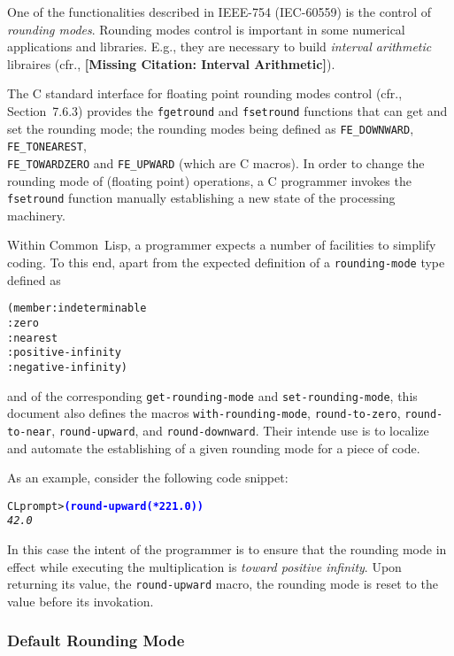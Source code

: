 \documentclass[10pt,fleqn]{article}
\newcommand{\CL}{\textsf{Common~Lisp}}
\newcommand{\CLang}{\textsf{C}}
\newcommand{\checkcite}[1]{{\textbf{[Missing Citation: #1]}}}
\newcommand{\code}[1]{\texttt{#1}}
\newcommand{\codeprompt}[1]{\textcolor{blue}{\textbf{#1}}}
\newcommand{\IEEEFPStd}{IEEE-754}
\newcommand{\IECFPStd}{IEC-60559}
\begin{document}
One of the functionalities described in \IEEEFPStd{} (\IECFPStd{}) is
the control of \emph{rounding modes}.  Rounding modes control is
important in some numerical applications and libraries.  E.g., they
are necessary to build \emph{interval arithmetic} libraires (cfr.,
\checkcite{Interval Arithmetic}).

The \CLang{} standard interface for floating point rounding modes
control (cfr., \cite{C18} Section~7.6.3) provides the \code{fgetround}
and \code{fsetround} functions that can get and set the rounding mode;
the rounding modes being defined as \code{FE\_DOWNWARD},
\code{FE\_TONEAREST},\\
\code{FE\_TOWARDZERO} and \code {FE\_UPWARD} (which are \CLang{}
macros).  In order to change the rounding mode of (floating point)
operations, a \CLang{} programmer invokes the \code{fsetround}
function manually establishing a new state of the processing
machinery.

Within \CL{}, a programmer expects a number of facilities to simplify
coding.  To this end, apart from the expected definition of a
\code{rounding-mode} type defined as
\begin{alltt}
(member :indeterminable
        :zero
        :nearest
        :positive-infinity
        :negative-infinity)
\end{alltt}
and of the corresponding \code{get-rounding-mode} and
\code{set-rounding-mode}, this document also defines the macros
\code{with-rounding-mode}, \code{round-to-zero}, \code{round-to-near},
\code{round-upward}, and \code{round-downward}.  Their intende use is
to localize and automate the establishing of a given rounding mode for
a piece of code.

\vspace*{3mm}

\noindent
As an example, consider the following code snippet:
\begin{alltt}
CL prompt> \codeprompt{(round-upward (* 2 21.0))}
\textit{42.0}
\end{alltt}
In this case the intent of the programmer is to ensure that the
rounding mode in effect while executing the multiplication is
\emph{toward positive infinity}.  Upon returning its value, the
\code{round-upward} macro, the rounding mode is reset to the value
before its invokation.

\subsubsection{Default Rounding Mode}
\end{document}
